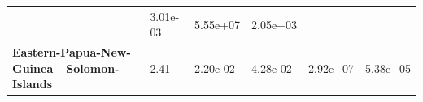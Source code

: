 \begin{table}[H]
{\begin{tabular}{llllll}
                                                                & 3.01e-03
                                                                & 5.55e+07
                                                                & 2.05e+03
            \\
            \textbf{Eastern-Papua-New-Guinea---Solomon-Islands} & 2.41
                                                                & 2.20e-02
                                                                &
            4.28e-02                                            & 2.92e+07
                                                                & 5.38e+05
            \\
            \hline
        \end{tabular}%
    }
\end{table}
